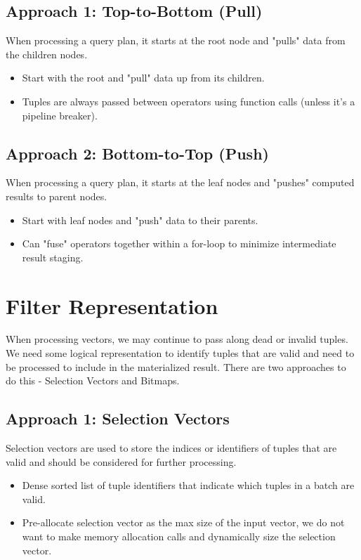 \documentclass[11pt]{article}
\begin{document}
\subsection{Approach 1: Top-to-Bottom (Pull)}
When processing a query plan, it starts at the root node and "pulls" data from the children nodes.
\begin{itemize}
    \item Start with the root and "pull" data up from its children.
    \item Tuples are always passed between operators using function calls (unless it's a pipeline breaker).
\end{itemize}
\subsection{Approach 2: Bottom-to-Top (Push)} 
When processing a query plan, it starts at the leaf nodes and "pushes" computed results to parent nodes.
 \begin{itemize}
     \item Start with leaf nodes and "push" data to their parents.
     \item Can "fuse" operators together within a for-loop to minimize intermediate result staging.
 \end{itemize} 

\section {Filter Representation}
When processing vectors, we may continue to pass along dead or invalid tuples. We need some logical representation to identify tuples that are valid and need to be processed to include in the materialized result. There are two approaches to do this - Selection Vectors and Bitmaps.

\subsection{Approach 1: Selection Vectors}
Selection vectors are used to store the indices or identifiers of tuples that are valid and should be considered for further processing.
\begin{itemize}
    \item Dense sorted list of tuple identifiers that indicate which tuples in a batch are valid. 
    \item Pre-allocate selection vector as the max size of the input vector, we do not want to make memory allocation calls and dynamically size the selection vector.
\end{itemize}
\end{document}
